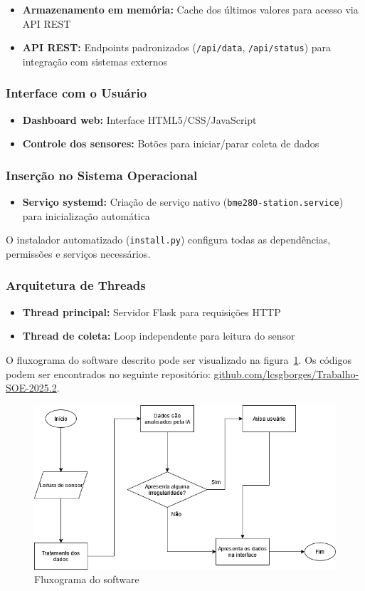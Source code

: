 \begin{itemize}
    \item \textbf{Armazenamento em memória:} Cache dos últimos valores para acesso via API REST
    \item \textbf{API REST:} Endpoints padronizados (\texttt{/api/data}, \texttt{/api/status}) para integração com sistemas externos
\end{itemize}

\subsubsection{Interface com o Usuário}

\begin{itemize}
    \item \textbf{Dashboard web:} Interface HTML5/CSS/JavaScript
    \item \textbf{Controle dos sensores:} Botões para iniciar/parar coleta de dados
\end{itemize}

\subsubsection{Inserção no Sistema Operacional}

\begin{itemize}
    \item \textbf{Serviço systemd:} Criação de serviço nativo (\texttt{bme280-station.service}) para inicialização automática
\end{itemize}

O instalador automatizado (\texttt{install.py}) configura todas as dependências, permissões e serviços necessários.

\subsubsection{Arquitetura de Threads}


\begin{itemize}
    \item \textbf{Thread principal:} Servidor Flask para requisições HTTP
    \item \textbf{Thread de coleta:} Loop independente para leitura do sensor
\end{itemize}

O fluxograma do software descrito pode ser visualizado na figura~\ref{fig:fluxograma}. 
Os códigos podem ser encontrados no seguinte repositório: 
\href{https://github.com/lcsgborges/Trabalho-SOE-2025.2/tree/main}{github.com/lcsgborges/Trabalho-SOE-2025.2}.

\begin{figure}[!ht]
    \centering
    \includegraphics[width=.45\textwidth]{figuras/soe_fluxograma.drawio.png}
    \caption{Fluxograma do software}
    \label{fig:fluxograma}
\end{figure}

